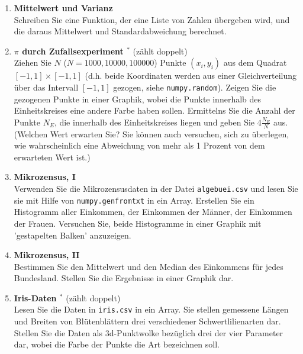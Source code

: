 \begin{enumerate}[1.]
\item \textbf{Mittelwert und Varianz}\\
Schreiben Sie eine Funktion, der eine Liste von Zahlen übergeben wird, 
und die daraus Mittelwert und Standardabweichung berechnet.

\item \textbf{$\pi$ durch Zufallsexperiment $^*$} (zählt doppelt)\\
Ziehen Sie $N$ ($N=1000,10000,100000$) Punkte $(x_i,y_i)$ aus
dem Quadrat $[-1,1]\times[-1,1]$ (d.h. beide Koordinaten werden
aus einer Gleichverteilung über das Intervall $[-1,1]$ gezogen, 
siehe \texttt{numpy.random}). Zeigen Sie die gezogenen Punkte
in einer Graphik, wobei die Punkte innerhalb des Einheitskreises
eine andere Farbe haben sollen. Ermittelns Sie die Anzahl der Punkte $N_E$,
die innerhalb des Einheitskreises liegen und geben Sie 
$4\frac{N_E}{N}$ aus. (Welchen Wert erwarten Sie? Sie können auch versuchen,
sich zu überlegen, wie wahrscheinlich eine Abweichung von mehr als 1 Prozent
von dem erwarteten Wert ist.)

\item \textbf{Mikrozensus, I}\\
Verwenden Sie die Mikrozensusdaten in der Datei \texttt{algebuei.csv}
und lesen Sie sie mit Hilfe von \verb|numpy.genfromtxt| in ein
Array. Erstellen Sie ein Histogramm aller Einkommen, der 
Einkommen der Männer, der Einkommen der Frauen. Versuchen
Sie, beide Histogramme in einer Graphik mit 'gestapelten Balken'
anzuzeigen.

\item \textbf{Mikrozensus, II}\\
Bestimmen Sie den Mittelwert und den Median
des Einkommens für jedes Bundesland.
Stellen Sie die Ergebnisse in einer 
Graphik dar.

\item \textbf{Iris-Daten $^*$} (zählt doppelt)\\
Lesen Sie die Daten in \texttt{iris.csv} in ein
Array.  Sie stellen gemessene Längen und  Breiten von
Blütenblättern drei verschiedener Schwertlilienarten dar.
Stellen Sie die Daten als 3d-Punktwolke bezüglich drei
der vier Parameter dar, wobei die Farbe der Punkte die
Art bezeichnen soll.  
\end{enumerate}

